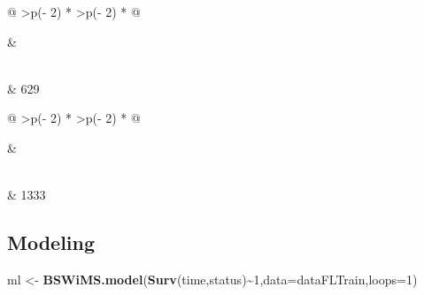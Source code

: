 \documentclass[
]{article}
\newenvironment{Shaded}{\begin{snugshade}}{\end{snugshade}}
\newcommand{\AttributeTok}[1]{\textcolor[rgb]{0.13,0.29,0.53}{#1}}
\newcommand{\DecValTok}[1]{\textcolor[rgb]{0.00,0.00,0.81}{#1}}
\newcommand{\FunctionTok}[1]{\textcolor[rgb]{0.13,0.29,0.53}{\textbf{#1}}}
\newcommand{\NormalTok}[1]{#1}
\newcommand{\OtherTok}[1]{\textcolor[rgb]{0.56,0.35,0.01}{#1}}
\newcommand{\SpecialCharTok}[1]{\textcolor[rgb]{0.81,0.36,0.00}{\textbf{#1}}}
\begin{document}
\begin{longtable}[]{@{}
  >{\centering\arraybackslash}p{(\columnwidth - 2\tabcolsep) * }
  >{\centering\arraybackslash}p{(\columnwidth - 2\tabcolsep) * }@{}}
\toprule\noalign{}
\begin{minipage}[b]{\linewidth}
\end{minipage} & \begin{minipage}[b]{\linewidth}
\end{minipage} \\
\midrule\noalign{}
\endhead
\bottomrule\noalign{}
 & 629 \\
\end{longtable}

\begin{Shaded}
\end{Shaded}

\begin{longtable}[]{@{}
  >{\centering\arraybackslash}p{(\columnwidth - 2\tabcolsep) * }
  >{\centering\arraybackslash}p{(\columnwidth - 2\tabcolsep) * }@{}}
\toprule\noalign{}
\begin{minipage}[b]{\linewidth}
\end{minipage} & \begin{minipage}[b]{\linewidth}
\end{minipage} \\
\midrule\noalign{}
\endhead
\bottomrule\noalign{}
 & 1333 \\
\end{longtable}

\hypertarget{modeling}{%
\subsection{Modeling}\label{modeling}}

\begin{Shaded}
\begin{Highlighting}[]
\NormalTok{ml }\OtherTok{\textless{}{-}} \FunctionTok{BSWiMS.model}\NormalTok{(}\FunctionTok{Surv}\NormalTok{(time,status)}\SpecialCharTok{\textasciitilde{}}\DecValTok{1}\NormalTok{,}\AttributeTok{data=}\NormalTok{dataFLTrain,}\AttributeTok{loops=}\DecValTok{1}\NormalTok{)}
\end{Highlighting}
\end{Shaded}
\end{document}
